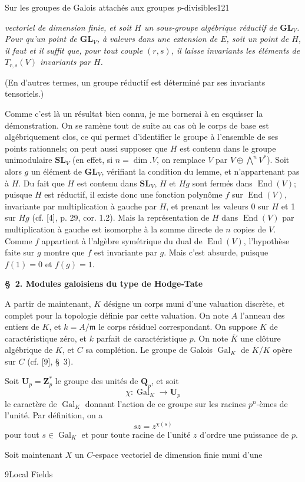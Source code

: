 \begin{center}Sur les groupes de Galois attachés aux groupes $p$-divisibles\hfill121\end{center}

\textit{vectoriel de dimension finie, et soit $H$ un sous-groupe algébrique réductif de $\mathbf{GL}_V$. Pour qu'un point de $\mathbf{GL}_V$, à valeurs dans une extension de $E$, soit un point de $H$, il faut et il suffit que, pour tout couple $(r,s)$, il laisse invariants les éléments de $T_{r,s}(V)$ invariants par $H$.}

(En d'autres termes, un groupe réductif est déterminé par ses invariants tensoriels.)

Comme c'est là un résultat bien connu, je me bornerai à en esquisser la démonstration. On se ramène tout de suite au cas où le corps de base est algébriquement clos, ce qui permet d'identifier le groupe à l'ensemble de ses points rationnels; on peut aussi supposer que $H$ est contenu dans le groupe unimodulaire $\mathbf{SL}_V$ (en effet, si $n=\dim.V$, on remplace $V$ par $V\oplus\bigwedge^n V^*$). Soit alors $g$ un élément de $\mathbf{GL}_V$, vérifiant la condition du lemme, et n'appartenant pas à $H$. Du fait que $H$ est contenu dans $\mathbf{SL}_V$, $H$ et $Hg$ sont fermés dans $\operatorname{End}(V)$; puisque $H$ est réductif, il existe donc une fonction polynôme $f$ sur $\operatorname{End}(V)$, invariante par multiplication à gauche par $H$, et prenant les valeurs 0 sur $H$ et 1 sur $Hg$ (cf. [4], p. 29, cor. 1.2). Mais la représentation de $H$ dans $\operatorname{End}(V)$ par multiplication à gauche est isomorphe à la somme directe de $n$ copies de $V$. Comme $f$ appartient à l'algèbre symétrique du dual de $\operatorname{End}(V)$, l'hypothèse faite sur $g$ montre que $f$ est invariante par $g$. Mais c'est absurde, puisque $f(1)=0$ et $f(g)=1$.

\begin{center}\textbf{\S\ 2. Modules galoisiens du type de Hodge-Tate}\end{center}

A partir de maintenant, $K$ désigne un corps muni d'une valuation discrète, et complet pour la topologie définie par cette valuation. On note $A$ l'anneau des entiers de $K$, et $k=A/\mathfrak m$ le corps résiduel correspondant. On suppose $K$ de caractéristique zéro, et $k$ parfait de caractéristique $p$. On note $\overline K$ une clôture algébrique de $K$, et $C$ sa complétion. Le groupe de Galois $\operatorname{Gal}_K$ de $\overline K/K$ opère sur $C$ (cf. [9], \S\ 3).

Soit $\mathbf U_p=\mathbf Z_p^*$ le groupe des unités de $\mathbf Q_p$, et soit
\[
\chi:\operatorname{Gal}_K\to\mathbf U_p
\]
le caractère de $\operatorname{Gal}_K$ donnant l'action de ce groupe sur les racines $p^n$-èmes de l'unité. Par définition, on a
\[
sz=z^{\chi(s)}
\]
pour tout $s\in\operatorname{Gal}_K$ et pour toute racine de l'unité $z$ d'ordre une puissance de $p$.

Soit maintenant $X$ un $C$-espace vectoriel de dimension finie muni d'une

9\qquad Local Fields
